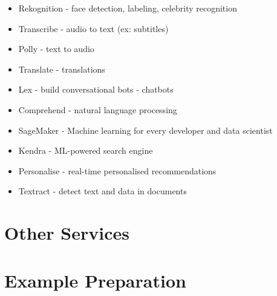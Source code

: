 \documentclass[11pt]{book}
\begin{document}
    \begin{itemize}
        \item Rekognition - face detection, labeling, celebrity recognition
        \item Transcribe - audio to text (ex: subtitles)
        \item Polly - text to audio
        \item Translate - translations
        \item Lex - build conversational bots - chatbots
        \item Comprehend - natural language processing
        \item SageMaker - Machine learning for every developer and data scientist
        \item Kendra - ML-powered search engine
        \item Personalise - real-time personalised recommendations
        \item Textract - detect text and data in documents
    \end{itemize}


    \chapter{Other Services}


    \chapter{Example Preparation}
\end{document}
